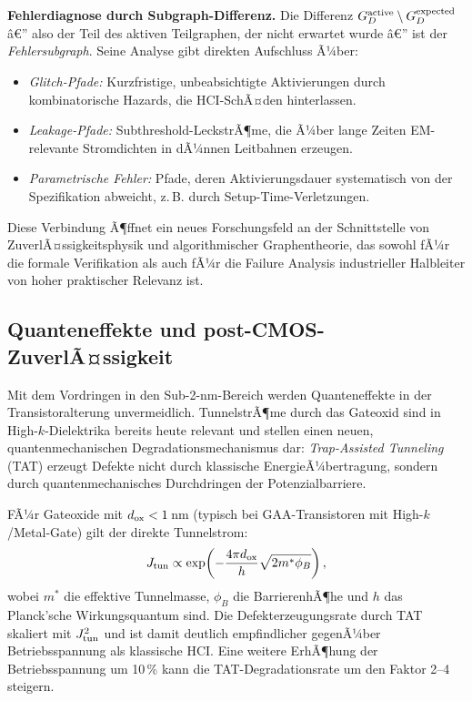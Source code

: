 ﻿\documentclass[a4paper,12pt]{article}
\theoremstyle{definition}
\begin{document}
\textbf{Fehlerdiagnose durch Subgraph-Differenz.}
Die Differenz $G_D^{\rm active} \setminus G_D^{\rm expected}$ â€” also der Teil
des aktiven Teilgraphen, der nicht erwartet wurde â€” ist der \emph{Fehlersubgraph}.
Seine Analyse gibt direkten Aufschluss Ã¼ber:
\begin{itemize}
	\item \emph{Glitch-Pfade:} Kurzfristige, unbeabsichtigte Aktivierungen durch
	      kombinatorische Hazards, die HCI-SchÃ¤den hinterlassen.
	\item \emph{Leakage-Pfade:} Subthreshold-LeckstrÃ¶me, die Ã¼ber lange Zeiten
	      EM-relevante Stromdichten in dÃ¼nnen Leitbahnen erzeugen.
	\item \emph{Parametrische Fehler:} Pfade, deren Aktivierungsdauer systematisch
	      von der Spezifikation abweicht, z.\,B. durch Setup-Time-Verletzungen.
\end{itemize}

Diese Verbindung Ã¶ffnet ein neues Forschungsfeld an der Schnittstelle von
ZuverlÃ¤ssigkeitsphysik und algorithmischer Graphentheorie, das sowohl fÃ¼r die
formale Verifikation als auch fÃ¼r die Failure Analysis industrieller Halbleiter
von hoher praktischer Relevanz ist.

\subsection{Quanteneffekte und post-CMOS-ZuverlÃ¤ssigkeit}
\label{sub:quantum}

Mit dem Vordringen in den Sub-2-nm-Bereich werden Quanteneffekte in der
Transistoralterung unvermeidlich. TunnelstrÃ¶me durch das Gateoxid sind in
High-$k$-Dielektrika bereits heute relevant und stellen einen neuen,
quantenmechanischen Degradationsmechanismus dar: \emph{Trap-Assisted Tunneling}
(TAT) erzeugt Defekte nicht durch klassische EnergieÃ¼bertragung, sondern durch
quantenmechanisches Durchdringen der Potenzialbarriere.

FÃ¼r Gateoxide mit $d_{\rm ox} < 1$\,nm (typisch bei GAA-Transistoren mit
High-$k$/Metal-Gate) gilt der direkte Tunnelstrom:
\[
J_{\rm tun} \propto \exp\!\left(-\frac{4\pi d_{\rm ox}}{h} \sqrt{2 m^* \phi_B}\right),
\]
wobei $m^*$ die effektive Tunnelmasse, $\phi_B$ die BarrierenhÃ¶he und $h$ das
Planck'sche Wirkungsquantum sind. Die Defekterzeugungsrate durch TAT skaliert
mit $J_{\rm tun}^2$ und ist damit deutlich empfindlicher gegenÃ¼ber
Betriebsspannung als klassische HCI. Eine weitere ErhÃ¶hung der Betriebsspannung
um 10\,\% kann die TAT-Degradationsrate um den Faktor 2--4 steigern.
\end{document}

